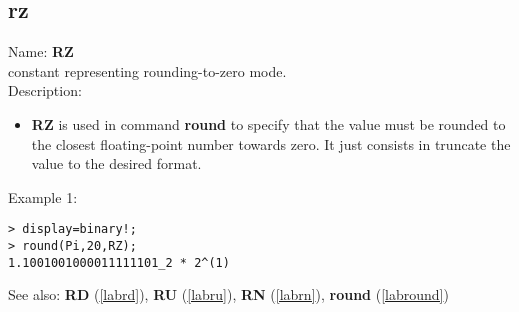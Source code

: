 \subsection{rz}
\label{labrz}
\noindent Name: \textbf{RZ}\\
constant representing rounding-to-zero mode.\\

\noindent Description: \begin{itemize}

\item \textbf{RZ} is used in command \textbf{round} to specify that the value must be rounded
   to the closest floating-point number towards zero. It just consists in 
   truncate the value to the desired format.
\end{itemize}
\noindent Example 1: 
\begin{center}\begin{minipage}{15cm}\begin{Verbatim}[frame=single]
> display=binary!;
> round(Pi,20,RZ);
1.1001001000011111101_2 * 2^(1)
\end{Verbatim}
\end{minipage}\end{center}
See also: \textbf{RD} (\ref{labrd}), \textbf{RU} (\ref{labru}), \textbf{RN} (\ref{labrn}), \textbf{round} (\ref{labround})
